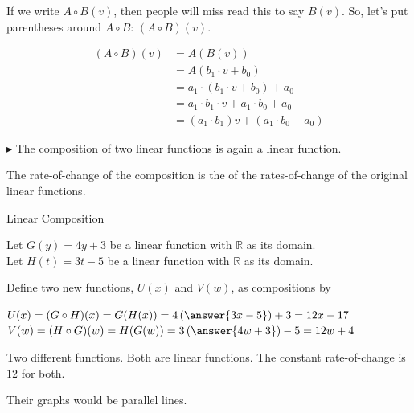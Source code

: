 \documentclass{ximera}
\begin{document}
\begin{notation}
If we write $A \circ B(v)$, then people will miss read this to say $B(v)$.  So, let's put parentheses around $A \circ B$: $(A \circ B)(v)$.
\end{notation}






\begin{align*}
(A \circ B)(v) & = A(B(v)) \\
& = A(b_1 \cdot v + b_0)  \\
& = a_1 \cdot (b_1 \cdot v + b_0) + a_0  \\
& = a_1 \cdot b_1 \cdot v + a_1 \cdot b_0 + a_0    \\
& = (a_1 \cdot b_1) v + (a_1 \cdot b_0 + a_0)
\end{align*}






$\blacktriangleright$ The composition of two linear functions is again a linear function.


\begin{observation}
The rate-of-change of the composition is the  of the rates-of-change of the original linear functions.
\end{observation}




\begin{example} Linear Composition

Let $G(y) = 4 y + 3$ be a linear function with $\mathbb{R}$ as its domain. \\
Let $H(t) = 3 t -5$ be a linear function with $\mathbb{R}$ as its domain. 


Define two new functions, $U(x)$ and $V(w)$, as compositions by

$U(x) = (G \circ H)(x) = G(H(x)) = 4 \left(\answer{3 x - 5}\right) + 3 = 12 x -17$ \\
$V(w) = (H \circ G)(w) =H(G(w)) = 3 \left(\answer{4 w + 3}\right) - 5 = 12 w + 4$ 


Two different functions. Both are linear functions. The constant rate-of-change is $12$ for both. 

Their graphs would be parallel lines. 


\end{example}
\end{document}
